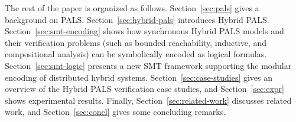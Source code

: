 

The rest of the paper is organized as follows.
%
Section~\ref{sec:pals} gives a background on  PALS.
Section~\ref{sec:hybrid-pals} introduces Hybrid PALS.
Section~\ref{sec:smt-encoding} shows how synchronous Hybrid PALS models 
and their verification problems (such as bounded reachability, inductive, and compositional analysis)
can be symbolically encoded as logical formulas.
Section~\ref{sec:smt-logic} presents a new SMT framework supporting
the 
modular encoding of  distributed hybrid systems. %
Section~\ref{sec:case-studies} gives an overview of the Hybrid PALS verification case studies,
and
Section~\ref{sec:expr} shows experimental results.
Finally,
Section~\ref{sec:related-work} discusses related work,
and 
Section~\ref{sec:concl} gives some concluding remarks.



